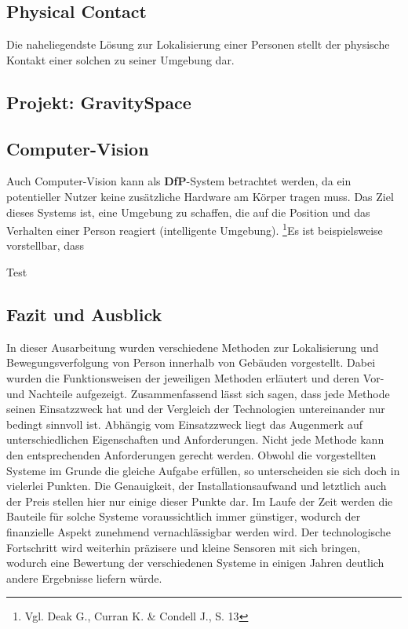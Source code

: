 \subsection{Physical Contact}
Die naheliegendste Lösung zur Lokalisierung einer Personen stellt der physische Kontakt einer solchen zu seiner Umgebung dar. 
\subsection{Projekt: GravitySpace}
\subsection{Computer-Vision}
Auch Computer-Vision kann als \textbf{DfP}-System betrachtet werden, da ein potentieller Nutzer keine zusätzliche Hardware am Körper tragen muss. Das Ziel dieses Systems ist, eine Umgebung zu schaffen, die auf die Position und das Verhalten einer Person reagiert (intelligente Umgebung). \footnote{Vgl. Deak G., Curran K. \& Condell J., S. 13}\newline Es ist beispielsweise vorstellbar, dass 

Test

\subsection{Fazit und Ausblick}
In dieser Ausarbeitung wurden verschiedene Methoden zur Lokalisierung und Bewegungsverfolgung von Person innerhalb von Gebäuden vorgestellt. Dabei wurden die Funktionsweisen der jeweiligen Methoden erläutert und deren Vor- und Nachteile aufgezeigt.\newline\newline 
Zusammenfassend lässt sich sagen, dass jede Methode seinen Einsatzzweck hat und der Vergleich der Technologien untereinander nur bedingt sinnvoll ist. Abhängig vom Einsatzzweck liegt das Augenmerk auf unterschiedlichen Eigenschaften und Anforderungen. Nicht jede Methode kann den entsprechenden Anforderungen gerecht werden. Obwohl die vorgestellten Systeme im Grunde die gleiche Aufgabe erfüllen, so unterscheiden sie sich doch in vielerlei Punkten. Die Genauigkeit, der Installationsaufwand und letztlich auch der Preis stellen hier nur einige dieser Punkte dar. \newline\newline
Im Laufe der Zeit werden die Bauteile für solche Systeme voraussichtlich immer günstiger, wodurch der finanzielle Aspekt zunehmend vernachlässigbar werden wird. Der technologische Fortschritt wird weiterhin präzisere und kleine Sensoren mit sich bringen, wodurch eine Bewertung der verschiedenen Systeme in einigen Jahren deutlich andere Ergebnisse liefern würde. 

